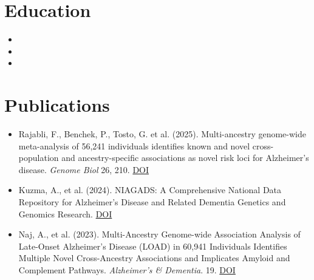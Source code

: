 \documentclass[11pt,a4paper,sans]{moderncv}
\begin{document}

\section{Education}
\vspace{1pt}
\begin{itemize}

\item{}

\vspace{3pt}

\item{}

\vspace{3pt}

\item{}

\end{itemize}


\section{Publications}
\vspace{1pt}
\begin{itemize}
\item Rajabli, F., Benchek, P., Tosto, G. et al. (2025). Multi-ancestry genome-wide meta-analysis of 56,241 individuals identifies known and novel cross-population and ancestry-specific associations as novel risk loci for Alzheimer's disease. \textit{Genome Biol} 26, 210. \href{https://doi.org/10.1186/s13059-025-03564-z}{DOI}
\item Kuzma, A., et al. (2024). NIAGADS: A Comprehensive National Data Repository for Alzheimer's Disease and Related Dementia Genetics and Genomics Research. \href{https://doi.org/10.1101/2024.10.07.24315029}{DOI}
\item Naj, A., et al. (2023). Multi-Ancestry Genome-wide Association Analysis of Late-Onset Alzheimer's Disease (LOAD) in 60,941 Individuals Identifies Multiple Novel Cross-Ancestry Associations and Implicates Amyloid and Complement Pathways. \textit{Alzheimer's \& Dementia}. 19. \href{https://doi.org/10.1002/alz.079401}{DOI}
\end{itemize}
\end{document}
